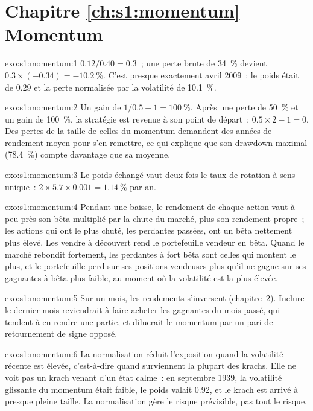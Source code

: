\section*{Chapitre \ref{ch:s1:momentum} --- Momentum}

\begin{solution}{exo:s1:momentum:1}
$0.12/0.40 = 0.3$~; une perte brute de 34~\% devient $0.3 \times (-0.34) = -10.2~\%$. C'est presque exactement avril 2009~: le poids était de 0.29 et la perte normalisée par la volatilité de 10.1~\%.
\end{solution}

\begin{solution}{exo:s1:momentum:2}
Un gain de $1/0.5 - 1 = 100~\%$. Après une perte de 50~\% et un gain de 100~\%, la stratégie est revenue à son point de départ~: $0.5 \times 2 - 1 = 0$. Des pertes de la taille de celles du momentum
demandent des années de rendement moyen pour s'en remettre, ce qui explique que son drawdown maximal (78.4~\%) compte davantage que sa moyenne.
\end{solution}

\begin{solution}{exo:s1:momentum:3}
Le poids échangé vaut deux fois le taux de rotation à sens unique~: $2 \times 5.7 \times 0.001 = 1.14~\%$ par an.
\end{solution}

\begin{solution}{exo:s1:momentum:4}
Pendant une baisse, le rendement de chaque action vaut à peu près son bêta multiplié par la chute du marché, plus son rendement propre~; les actions qui ont le plus chuté, les perdantes passées, ont
un bêta nettement plus élevé. Les vendre à découvert rend le portefeuille vendeur en bêta. Quand le marché rebondit fortement, les perdantes à fort bêta sont celles qui montent le plus, et le portefeuille perd
sur ses positions vendeuses plus qu'il ne gagne sur ses gagnantes à bêta plus faible, au moment où la volatilité est la plus élevée.
\end{solution}

\begin{solution}{exo:s1:momentum:5}
Sur un mois, les rendements s'inversent (chapitre~2). Inclure le dernier mois reviendrait à faire acheter les gagnantes du mois passé, qui tendent à en rendre une partie,
et diluerait le momentum par un pari de retournement de signe opposé.
\end{solution}

\begin{solution}{exo:s1:momentum:6}
La normalisation réduit l'exposition quand la volatilité récente est élevée, c'est-à-dire quand surviennent la plupart des krachs. Elle ne voit pas un krach venant d'un état calme~: en septembre
1939, la volatilité glissante du momentum était faible, le poids valait 0.92, et le krach est arrivé à presque pleine taille. La normalisation gère le risque prévisible, pas tout le risque.
\end{solution}

